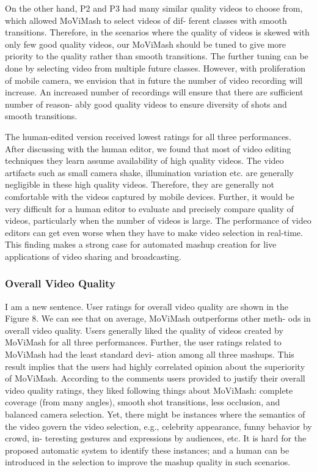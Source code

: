 \documentclass{sig-alternate}
\begin{document}
On the other hand, P2 and P3 had many similar quality videos
to choose from, which allowed MoViMash to select videos of dif-
ferent classes with smooth transitions. Therefore, in the scenarios
where the quality of videos is skewed with only few good quality
videos, our MoViMash should be tuned to give more priority to
the quality rather than smooth transitions. The further tuning can
be done by selecting video from multiple future classes. However,
with proliferation of mobile camera, we envision that in future the
number of video recording will increase. An increased number of
recordings will ensure that there are sufficient number of reason-
ably good quality videos to ensure diversity of shots and smooth
transitions.

The human-edited version received lowest ratings for all three
performances. After discussing with the human editor, we found
that most of video editing techniques they learn assume availability
of high quality videos. The video artifacts such as small camera
shake, illumination variation etc. are generally negligible in these
high quality videos. Therefore, they are generally not comfortable
with the videos captured by mobile devices. Further, it would be
very difficult for a human editor to evaluate and precisely compare
quality of videos, particularly when the number of videos is large.
The performance of video editors can get even worse when they
have to make video selection in real-time. This finding makes a
strong case for automated mashup creation for live applications of
video sharing and broadcasting.

\subsubsection{Overall Video Quality}
I am a new sentence.
User ratings for overall video quality are shown in the Figure 8.
We can see that on average, MoViMash outperforms other meth-
ods in overall video quality. Users generally liked the quality of
videos created by MoViMash for all three performances. Further,
the user ratings related to MoViMash had the least standard devi-
ation among all three mashups. This result implies that the users
had highly correlated opinion about the superiority of MoViMash.
According to the comments users provided to justify their overall
video quality ratings, they liked following things about MoViMash:
complete coverage (from many angles), smooth shot transitions,
less occlusion, and balanced camera selection. Yet, there might
be instances where the semantics of the video govern the video
selection, e.g., celebrity appearance, funny behavior by crowd, in-
teresting gestures and expressions by audiences, etc. It is hard for
the proposed automatic system to identify these instances; and a
human can be introduced in the selection to improve the mashup
quality in such scenarios.
\end{document}
